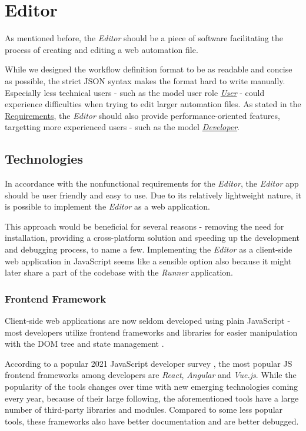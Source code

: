 \section{Editor}

As mentioned before, the \textit{Editor} should be a piece of software facilitating the process of creating and editing a web automation file.

While we designed the workflow definition format to be as readable and concise as possible, the strict JSON syntax makes the format hard to write manually.
Especially less technical users - such as the model user role \hyperref[UserUserRole]{\textit{User}} - could experience difficulties when trying to edit 
larger automation files. 
As stated in the \hyperref[requirements]{Requirements}, the \textit{Editor} should also provide performance-oriented features,
targetting more experienced users - such as the model \hyperref[DevUserRole]{\textit{Developer}}.

\subsection{Technologies}
In accordance with the nonfunctional requirements for the \textit{Editor}, the \textit{Editor} app should be user friendly and easy to use.
Due to its relatively lightweight nature, it is possible to implement the \textit{Editor} as a web application. 

This approach would be beneficial for several reasons - removing the need for installation, providing a cross-platform solution and speeding up the development and debugging process, to name a few.
Implementing the \textit{Editor} as a client-side web application in JavaScript seems like a sensible option also because it might later share a part of the codebase with the \textit{Runner} application.

\subsubsection{Frontend Framework}

Client-side web applications are now seldom developed using plain JavaScript - most developers utilize frontend frameworks and libraries for easier manipulation with the \ac{DOM} tree and state management .

According to a popular 2021 JavaScript developer survey , the most popular \ac{JS} frontend frameworks among developers are \textit{React}, \textit{Angular} and \textit{Vue.js}.
While the popularity of the tools changes over time with new emerging technologies coming every year, because of their large following, the aforementioned tools have a large number of third-party libraries 
and modules. Compared to some less popular tools, these frameworks also have better documentation and are better debugged.

